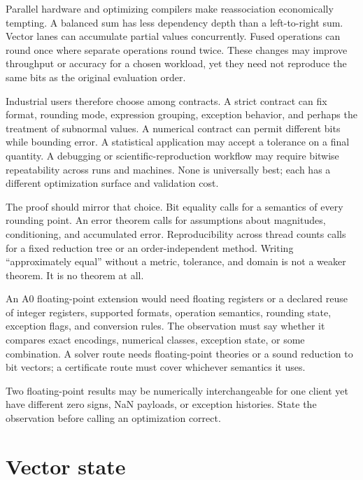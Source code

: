 Parallel hardware and optimizing compilers make reassociation economically
tempting. A balanced sum has less dependency depth than a left-to-right sum.
Vector lanes can accumulate partial values concurrently. Fused operations can
round once where separate operations round twice. These changes may improve
throughput or accuracy for a chosen workload, yet they need not reproduce the
same bits as the original evaluation order.

Industrial users therefore choose among contracts. A strict contract can fix
format, rounding mode, expression grouping, exception behavior, and perhaps
the treatment of subnormal values. A numerical contract can permit different
bits while bounding error. A statistical application may accept a tolerance
on a final quantity. A debugging or scientific-reproduction workflow may
require bitwise repeatability across runs and machines. None is universally
best; each has a different optimization surface and validation cost.

The proof should mirror that choice. Bit equality calls for a semantics of
every rounding point. An error theorem calls for assumptions about magnitudes,
conditioning, and accumulated error. Reproducibility across thread counts
calls for a fixed reduction tree or an order-independent method. Writing
``approximately equal'' without a metric, tolerance, and domain is not a
weaker theorem. It is no theorem at all.

An A0 floating-point extension would need floating registers or a declared
reuse of integer registers, supported formats, operation semantics, rounding
state, exception flags, and conversion rules. The observation must say whether
it compares exact encodings, numerical classes, exception state, or some
combination. A solver route needs floating-point theories or a sound reduction
to bit vectors; a certificate route must cover whichever semantics it uses.

\begin{warning}[title={Bit-pattern equality and numerical agreement differ}]
Two floating-point results may be numerically interchangeable for one client
yet have different zero signs, NaN payloads, or exception histories. State the
observation before calling an optimization correct.
\end{warning}

\section{Vector state}

